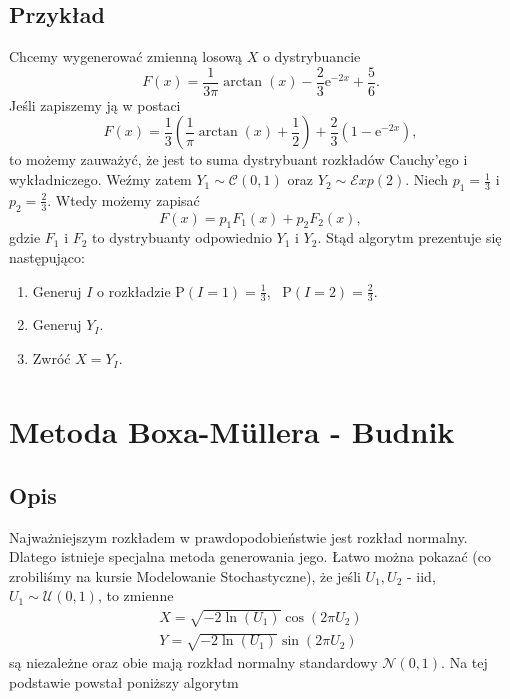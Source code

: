 \documentclass[12pt]{mwrep}
\begin{document}
	\subsection{Przykład}
	\noindent Chcemy wygenerować zmienną losową $X$ o dystrybuancie
	$$ F(x) = \frac{1}{3\pi}\arctan(x) - \frac{2}{3}\mathrm{e}^{-2x} + \frac{5}{6}. $$
	Jeśli zapiszemy ją w postaci
	$$ F(x) = \frac{1}{3}\left(\frac{1}{\pi}\arctan(x) + \frac{1}{2}\right) + \frac{2}{3}\left(1 - \mathrm{e}^{-2x}\right), $$
	to możemy zauważyć, że jest to suma dystrybuant rozkładów Cauchy'ego i wykładniczego. Weźmy zatem $Y_1 \sim \mathcal{C}(0, 1)$ oraz $Y_2 \sim \mathcal{E}xp(2)$. Niech $p_1 = \frac{1}{3}$ i $p_2 = \frac{2}{3}$. Wtedy możemy zapisać
	$$ F(x) = p_1 F_1(x) + p_2 F_2(x), $$
	gdzie $F_1$ i $F_2$ to dystrybuanty odpowiednio $Y_1$ i $Y_2$. Stąd algorytm prezentuje się następująco:
	\begin{enumerate}[leftmargin=10mm]
		\item Generuj $I$ o rozkładzie $\mathrm{P}(I = 1) = \frac{1}{3}$, \ $\mathrm{P}(I = 2) = \frac{2}{3}$.
		\item Generuj $Y_I$.
		\item Zwróć $X = Y_I$.
	\end{enumerate}



	
	\section{Metoda Boxa-M{\"u}llera\textsuperscript{\cite{box-kox}} - Budnik}
	\subsection{Opis}
	\noindent Najważniejszym rozkładem w prawdopodobieństwie jest rozkład normalny. Dlatego istnieje specjalna metoda generowania jego. Łatwo można pokazać (co zrobiliśmy na kursie Modelowanie Stochastyczne), że jeśli $U_1,U_2$ - iid, $U_1\sim\mathcal{U}(0,1)$, to zmienne
	\begin{equation}\label{eq:B-M}
		\begin{split}
			X=\sqrt{-2\ln(U_1)}\cos(2\pi U_2)\\
			Y=\sqrt{-2\ln(U_1)}\sin(2\pi U_2)
		\end{split}
	\end{equation}
	są niezależne oraz obie mają rozkład normalny standardowy $\mathcal{N}(0,1)$. Na tej podstawie powstał poniższy algorytm
\end{document}
